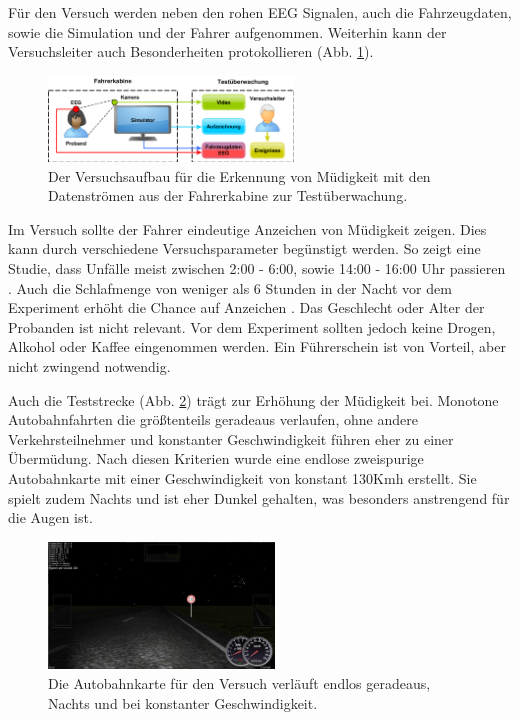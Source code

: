 {\begin{figure}[h]
\begin{center}
  \end{center}
\end{figure}

Für den Versuch werden neben den rohen EEG Signalen, auch die Fahrzeugdaten, sowie die Simulation und der Fahrer aufgenommen. Weiterhin kann der Versuchsleiter auch Besonderheiten protokollieren (Abb. \ref{fig:experiment}).

\begin{figure}[h] 
  \begin{center}
    \includegraphics[width=6.5cm]{img/experiment}
    \caption[Experiment]{Der Versuchsaufbau für die Erkennung von Müdigkeit mit den Datenströmen aus der Fahrerkabine zur Testüberwachung. \label{fig:experiment}}
  \end{center}
\end{figure}

Im Versuch sollte der Fahrer eindeutige Anzeichen von Müdigkeit zeigen. Dies kann durch verschiedene Versuchsparameter begünstigt werden. So zeigt eine Studie, dass Unfälle meist zwischen 2:00 - 6:00, sowie 14:00 - 16:00 Uhr passieren \cite{Horne_1757738}. Auch die Schlafmenge von weniger als 6 Stunden in der Nacht vor dem Experiment erhöht die Chance auf Anzeichen \cite{Engstrom_2322937}. Das Geschlecht oder Alter der Probanden ist nicht relevant. Vor dem Experiment sollten jedoch keine Drogen, Alkohol oder Kaffee eingenommen werden. Ein Führerschein ist von Vorteil, aber nicht zwingend notwendig.

Auch die Teststrecke (Abb. \ref{fig:drivingtask}) trägt zur Erhöhung der Müdigkeit bei. Monotone Autobahnfahrten die größtenteils geradeaus verlaufen, ohne andere Verkehrsteilnehmer und konstanter Geschwindigkeit führen eher zu einer Übermüdung. Nach diesen Kriterien wurde eine endlose zweispurige Autobahnkarte mit einer Geschwindigkeit von konstant 130Kmh erstellt. Sie spielt zudem Nachts und ist eher Dunkel gehalten, was besonders anstrengend für die Augen ist.

\begin{figure}[h] 
  \begin{center}
    \includegraphics[width=6cm]{img/drivingtask}
    \caption[Driving Task]{Die Autobahnkarte für den Versuch verläuft endlos geradeaus, Nachts und bei konstanter Geschwindigkeit. \label{fig:drivingtask}}
  \end{center}
\end{figure}

}
